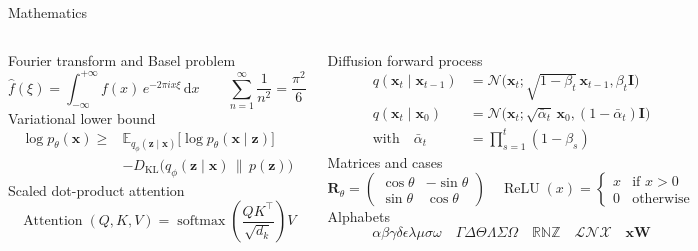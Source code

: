 \documentclass[8pt, aspectratio=169]{beamer}
\begin{document}
\begin{frame}{Mathematics}
  \begin{columns}[T,onlytextwidth]
      Fourier transform and Basel problem
      \[
        \hat{f}(\xi) = \int_{-\infty}^{+\infty} f(x)\, e^{-2\pi i x \xi}\, \mathrm{d}x
        \qquad
        \sum_{n=1}^{\infty} \frac{1}{n^2} = \frac{\pi^2}{6}
      \]
      Variational lower bound
      \begin{align*}
        \log p_\theta(\mathbf{x}) \geq{}&
        \mathbb{E}_{q_\phi(\mathbf{z} \mid \mathbf{x})}
        \big[ \log p_\theta(\mathbf{x} \mid \mathbf{z}) \big] \\
        &- D_{\mathrm{KL}}\big( q_\phi(\mathbf{z} \mid \mathbf{x}) \,\|\, p(\mathbf{z}) \big)
      \end{align*}
      Scaled dot-product attention
      \[
        \operatorname{Attention}(Q, K, V) =
        \operatorname{softmax}\!\left( \frac{Q K^{\top}}{\sqrt{d_k}} \right) V
      \]

      Diffusion forward process
      \begin{align*}
        q(\mathbf{x}_t \mid \mathbf{x}_{t-1}) &=
          \mathcal{N}\big(\mathbf{x}_t ; \sqrt{1-\beta_t}\, \mathbf{x}_{t-1}, \beta_t \mathbf{I}\big) \\
        q(\mathbf{x}_t \mid \mathbf{x}_0) &=
          \mathcal{N}\big(\mathbf{x}_t ; \sqrt{\bar{\alpha}_t}\, \mathbf{x}_0, (1-\bar{\alpha}_t) \mathbf{I}\big) \\
        \text{with} \quad \bar{\alpha}_t &= \prod_{s=1}^{t} (1-\beta_s)
      \end{align*}
      Matrices and cases
      \[
        \mathbf{R}_\theta =
        \begin{pmatrix}
          \cos\theta & -\sin\theta \\
          \sin\theta & \cos\theta
        \end{pmatrix}
        \quad
        \operatorname{ReLU}(x) =
        \begin{cases}
          x & \text{if } x > 0 \\
          0 & \text{otherwise}
        \end{cases}
      \]
      Alphabets
      \[
        \alpha\beta\gamma\delta\epsilon\lambda\mu\sigma\omega
        \quad \Gamma\Delta\Theta\Lambda\Sigma\Omega
        \quad \mathbb{R}\mathbb{N}\mathbb{Z}
        \quad \mathcal{L}\mathcal{N}\mathcal{X}
        \quad \mathbf{x}\mathbf{W}
      \]
  \end{columns}
\end{frame}
\end{document}
